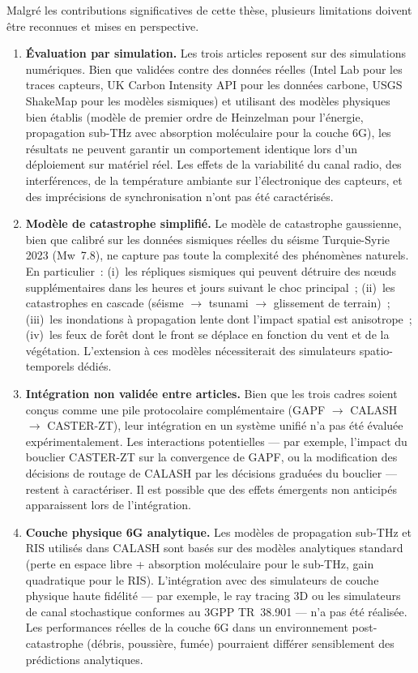 Malgré les contributions significatives de cette thèse, plusieurs limitations doivent être reconnues et mises en perspective.

\begin{enumerate}
    \item \textbf{Évaluation par simulation.} Les trois articles reposent sur des simulations numériques. Bien que validées contre des données réelles (Intel Lab pour les traces capteurs, UK Carbon Intensity API pour les données carbone, USGS ShakeMap pour les modèles sismiques) et utilisant des modèles physiques bien établis (modèle de premier ordre de Heinzelman \cite{heinzelman2000leach} pour l'énergie, propagation sub-THz avec absorption moléculaire pour la couche 6G), les résultats ne peuvent garantir un comportement identique lors d'un déploiement sur matériel réel. Les effets de la variabilité du canal radio, des interférences, de la température ambiante sur l'électronique des capteurs, et des imprécisions de synchronisation n'ont pas été caractérisés.

    \item \textbf{Modèle de catastrophe simplifié.} Le modèle de catastrophe gaussienne, bien que calibré sur les données sismiques réelles du séisme Turquie-Syrie 2023 (Mw~7.8), ne capture pas toute la complexité des phénomènes naturels. En particulier~: (i)~les répliques sismiques qui peuvent détruire des n\oe{}uds supplémentaires dans les heures et jours suivant le choc principal~; (ii)~les catastrophes en cascade (séisme $\to$ tsunami $\to$ glissement de terrain)~; (iii)~les inondations à propagation lente dont l'impact spatial est anisotrope~; (iv)~les feux de forêt dont le front se déplace en fonction du vent et de la végétation. L'extension à ces modèles nécessiterait des simulateurs spatio-temporels dédiés.

    \item \textbf{Intégration non validée entre articles.} Bien que les trois cadres soient conçus comme une pile protocolaire complémentaire (GAPF $\to$ CALASH $\to$ CASTER-ZT), leur intégration en un système unifié n'a pas été évaluée expérimentalement. Les interactions potentielles --- par exemple, l'impact du bouclier CASTER-ZT sur la convergence de GAPF, ou la modification des décisions de routage de CALASH par les décisions graduées du bouclier --- restent à caractériser. Il est possible que des effets émergents non anticipés apparaissent lors de l'intégration.

    \item \textbf{Couche physique 6G analytique.} Les modèles de propagation sub-THz et RIS utilisés dans CALASH sont basés sur des modèles analytiques standard (perte en espace libre + absorption moléculaire pour le sub-THz, gain quadratique pour le RIS). L'intégration avec des simulateurs de couche physique haute fidélité --- par exemple, le ray tracing 3D ou les simulateurs de canal stochastique conformes au 3GPP TR~38.901 --- n'a pas été réalisée. Les performances réelles de la couche 6G dans un environnement post-catastrophe (débris, poussière, fumée) pourraient différer sensiblement des prédictions analytiques.


\end{enumerate}
